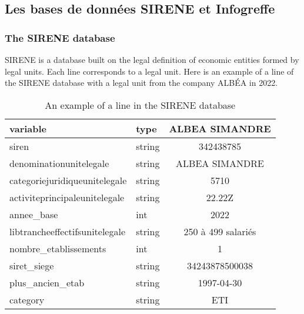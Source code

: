 \documentclass[AEJ]{AEA}
\begin{document}
\subsection{Les bases de données SIRENE et Infogreffe}
\subsubsection{The SIRENE database}
SIRENE is a database built on the legal definition of economic entities
formed by legal units. Each line corresponds to a legal unit. Here is an example
of a line of the SIRENE database with a legal unit from the company ALBÉA in 2022.
\begin{table}
    \begin{tabular}{l|l|c}
        \hline
        variable & type & ALBEA SIMANDRE \\
        \hline
        siren & string & 342438785 \\
        \hline
        denominationunitelegale & string & ALBEA SIMANDRE \\
        \hline
        categoriejuridiqueunitelegale  & string & 5710 \\
        \hline
        activiteprincipaleunitelegale & string & 22.22Z \\
        \hline
        annee\_base & int & 2022 \\
        \hline
        libtrancheeffectifsunitelegale & string & 250 à 499 salariés \\
        \hline
        nombre\_etablissements & int & 1 \\
        \hline
        siret\_siege & string & 34243878500038 \\
        \hline
        plus\_ancien\_etab & string & 1997-04-30 \\
        \hline
        category & string & ETI \\
        \hline
    \end{tabular}
    \caption{An example of a line in the SIRENE database}
\end{table}
\end{document}

